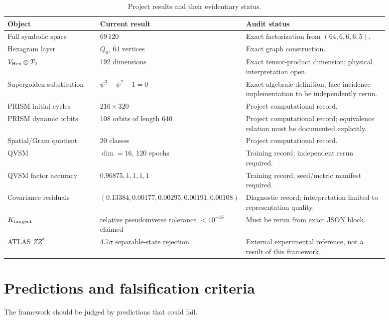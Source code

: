 \documentclass[11pt,a4paper]{article}
\numberwithin{equation}{section}
\begin{document}
\begin{table}[t]
\centering
\small
\begin{tabular}{p{0.27\linewidth}p{0.19\linewidth}p{0.43\linewidth}}
\toprule
Object & Current result & Audit status \\
\midrule
Full symbolic space & $69\,120$ & Exact factorization from $(64,6,6,6,5)$. \\
Hexagram layer & $Q_6$, 64 vertices & Exact graph construction. \\
$V_{\rm Hex}\otimes T_2$ & 192 dimensions & Exact tensor-product dimension; physical interpretation open. \\
Supergolden substitution & $\psi^3-\psi^2-1=0$ & Exact algebraic definition; face-incidence implementation to be independently rerun. \\
PRISM initial cycles & $216\times320$ & Project computational record. \\
PRISM dynamic orbits & 108 orbits of length 640 & Project computational record; equivalence relation must be documented explicitly. \\
Spatial/Gram quotient & 20 classes & Project computational record. \\
QVSM & $\dim=16$, 120 epochs & Training record; independent rerun required. \\
QVSM factor accuracy & $0.96875,1,1,1,1$ & Training record; seed/metric manifest required. \\
Covariance residuals & $(0.13384,0.00177,0.00295,0.00191,0.00108)$ & Diagnostic record; interpretation limited to representation quality. \\
$K_{\rm tangent}$ & relative pseudoinverse tolerance $<10^{-16}$ claimed & Must be rerun from exact JSON block. \\
ATLAS $ZZ^*$ & 4.7$\sigma$ separable-state rejection & External experimental reference, not a result of this framework. \\
\bottomrule
\end{tabular}
\caption{Project results and their evidentiary status.}
\label{tab:inventory}
\end{table}

\section{Predictions and falsification criteria}
\label{sec:predictions}

The framework should be judged by predictions that could fail.
\end{document}
